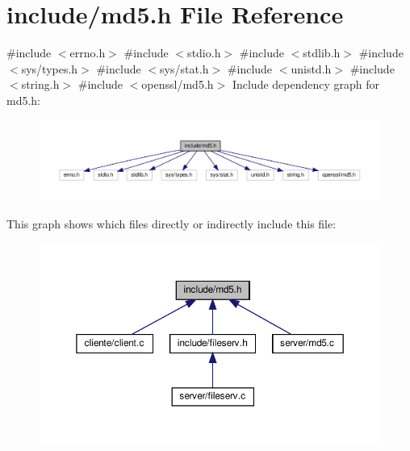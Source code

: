 \section{include/md5.h File Reference}
\label{md5_8h}
{\ttfamily \#include $<$errno.\+h$>$}\newline
{\ttfamily \#include $<$stdio.\+h$>$}\newline
{\ttfamily \#include $<$stdlib.\+h$>$}\newline
{\ttfamily \#include $<$sys/types.\+h$>$}\newline
{\ttfamily \#include $<$sys/stat.\+h$>$}\newline
{\ttfamily \#include $<$unistd.\+h$>$}\newline
{\ttfamily \#include $<$string.\+h$>$}\newline
{\ttfamily \#include $<$openssl/md5.\+h$>$}\newline
Include dependency graph for md5.\+h\+:\nopagebreak
\begin{figure}[H]
\begin{center}
\leavevmode
\includegraphics[width=350pt]{md5_8h__incl}
\end{center}
\end{figure}
This graph shows which files directly or indirectly include this file\+:\nopagebreak
\begin{figure}[H]
\begin{center}
\leavevmode
\includegraphics[width=350pt]{md5_8h__dep__incl}
\end{center}
\end{figure}
